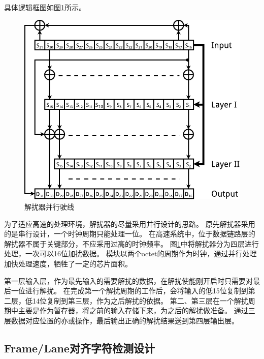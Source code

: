\documentclass[UTF8]{ctexart}
\begin{document}
具体逻辑框图如图\ref{fig:scrambler_descrambler_parallel_implementation}所示。

\begin{figure}[H]
\centering
\includegraphics[width=18cm]{./img/scrambler_descrambler_parallel_implementation.pdf}
\caption{解扰器并行驶线}
\label{fig:scrambler_descrambler_parallel_implementation}
\end{figure}

为了适应高速的处理环境，解扰器的尽量采用并行设计的思路。
原先解扰器采用的是串行设计，一个时钟周期只能处理一位。
在高速系统中，位于数据链路层的解扰器不属于关键部分，不应采用过高的时钟频率。
图\ref{fig:scrambler_descrambler_parallel_implementation}中将解扰器分为四层进行处理，一次可以16位加扰数据。
模块以两个octet的周期作为时钟，通过并行处理加快处理速度，牺牲了一定的芯片面积。

第一层输入层，作为最先输入的需要解扰的数据，在解扰使能刚开启时只需要对最后一位进行解扰。
在完成第一个解扰周期的工作后，会将输入的低15位复制到第二层，低14位复制到第三层，作为之后解扰的依据。
第二、第三层在一个解扰周期中主要是作为暂存器，将之前的输入存储下来，为之后的解扰做准备。
通过三层数据对应位置的亦或操作，最后输出正确的解扰结果送到第四层输出层。


\subsection{Frame/Lane对齐字符检测设计}


\end{document}
